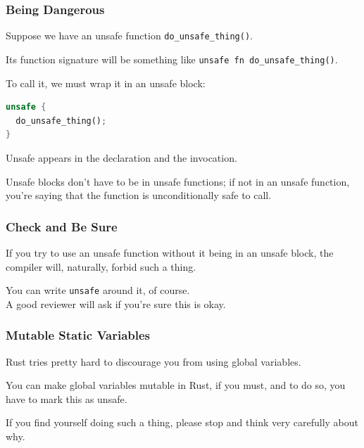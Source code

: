 \begin{frame}[fragile]
\frametitle{Being Dangerous}

Suppose we have an unsafe function \texttt{do\_unsafe\_thing()}.

Its function signature will be something like \texttt{unsafe fn do\_unsafe\_thing()}.

To call it, we must wrap it in an unsafe block:

\begin{lstlisting}[language=Rust]
unsafe {
  do_unsafe_thing();
}
\end{lstlisting}

Unsafe appears in the declaration and the invocation.

Unsafe blocks don't have to be in unsafe functions; if not in an unsafe function, you're saying
that the function is unconditionally safe to call.

\end{frame}


\begin{frame}
\frametitle{Check and Be Sure}

If you try to use an unsafe function without it being in an unsafe block, the compiler will, naturally, forbid such a thing.

You can write \texttt{unsafe} around it, of course.\\
\quad A good reviewer will ask if you're sure this is okay.


\end{frame}


\begin{frame}
\frametitle{Mutable Static Variables}

Rust tries pretty hard to discourage you from using global variables.

You can make global variables mutable in Rust, if you must, and to do so, you have to mark this as unsafe. 

If you find yourself doing such a thing, please stop and think very carefully about why.


\end{frame}




